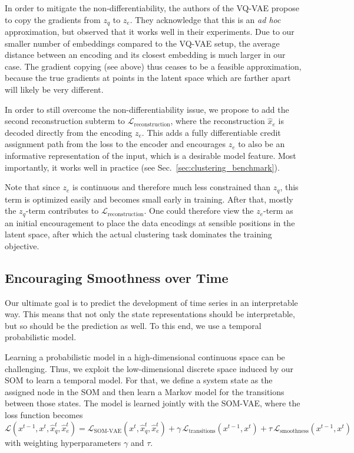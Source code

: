 In order to mitigate the non-differentiability, the authors of the VQ-VAE propose to copy the gradients from $z_q$ to $z_e$.
They acknowledge that this is an \emph{ad hoc} approximation, but observed that it works well in their experiments.
Due to our smaller number of embeddings compared to the VQ-VAE setup, the average distance between an encoding and its closest embedding is much larger in our case.
The gradient copying (see above) thus ceases to be a feasible approximation, because the true gradients at points in the latent space which are farther apart will likely be very different.

In order to still overcome the non-differentiability issue, we propose to add the second reconstruction subterm to $\mathcal{L}_{\text{reconstruction}}$, where the reconstruction $\hat{x}_e$ is decoded directly from the encoding $z_e$.
This adds a fully differentiable credit assignment path from the loss to the encoder and encourages $z_e$ to also be an informative representation of the input, which is a desirable model feature.
Most importantly, it works well in practice (see Sec.\ \ref{sec:clustering_benchmark}).

Note that since $z_e$ is continuous and therefore much less constrained than $z_q$, this term is optimized easily and becomes small early in training.
After that, mostly the $z_q$-term contributes to $\mathcal{L}_{\text{reconstruction}}$.
One could therefore view the $z_e$-term as an initial encouragement to place the data encodings at sensible positions in the latent space, after which the actual clustering task dominates the training objective.



\subsection{Encouraging Smoothness over Time}\label{sec:probabilistic_model}

Our ultimate goal is to predict the development of time series in an interpretable way.
This means that not only the state representations should be interpretable, but so should be the prediction as well.
To this end, we use a temporal probabilistic model.

Learning a probabilistic model in a high-dimensional continuous space can be challenging.
Thus, we exploit the low-dimensional discrete space induced by our SOM to learn a temporal model.
For that, we define a system state as the assigned node in the SOM and then learn a Markov model for the transitions between those states.
The model is learned jointly with the SOM-VAE, where the loss function becomes
%
\begin{equation}\label{eq:L_prob}
    \mathcal{L}(x^{t-1}, x^t, \hat{x}_q^t, \hat{x}_e^t) = \mathcal{L}_{\text{SOM-VAE}}(x^t, \hat{x}_q^t, \hat{x}_e^t) + \gamma \, \mathcal{L}_{\text{transitions}}(x^{t-1}, x^t) + \tau \, \mathcal{L}_{\text{smoothness}}(x^{t-1}, x^t)
\end{equation}
%
with weighting hyperparameters $\gamma$ and $\tau$.

